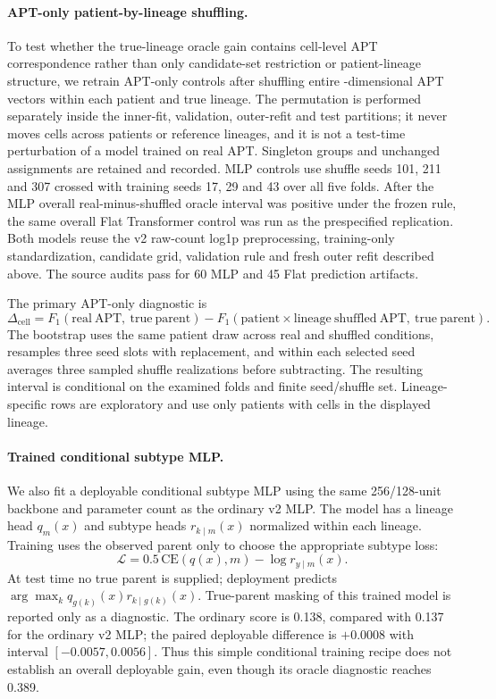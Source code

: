 \paragraph{APT-only patient-by-lineage shuffling.}
To test whether the true-lineage oracle gain contains cell-level APT
correspondence rather than only candidate-set restriction or patient-lineage
structure, we retrain APT-only controls after shuffling entire
\numaptfeatures{}-dimensional APT vectors within each patient and true
lineage. The permutation is performed separately inside the inner-fit,
validation, outer-refit and test partitions; it never moves cells across
patients or reference lineages, and it is not a test-time perturbation of a
model trained on real APT. Singleton groups and unchanged assignments are
retained and recorded. MLP controls use shuffle seeds 101, 211 and 307 crossed
with training seeds 17, 29 and 43 over all five folds. After the MLP overall
real-minus-shuffled oracle interval was positive under the frozen rule, the
same overall Flat Transformer control was run as the prespecified replication.
Both models reuse the v2 raw-count log1p preprocessing, training-only
standardization, candidate grid, validation rule and fresh outer refit
described above. The source audits pass for 60 MLP and 45 Flat prediction
artifacts.

The primary APT-only diagnostic is
\[
\Delta_{\mathrm{cell}} =
F_1(\mathrm{real\ APT,\ true\ parent})
-F_1(\mathrm{patient}\times\mathrm{lineage\ shuffled\ APT,\ true\ parent}).
\]
The bootstrap uses the same patient draw across real and shuffled conditions,
resamples three seed slots with replacement, and within each selected seed
averages three sampled shuffle realizations before subtracting. The resulting
interval is conditional on the examined folds and finite seed/shuffle set.
Lineage-specific rows are exploratory and use only patients with cells in the
displayed lineage.

\paragraph{Trained conditional subtype MLP.}
We also fit a deployable conditional subtype MLP using the same 256/128-unit
backbone and parameter count as the ordinary v2 MLP. The model has a lineage
head $q_m(x)$ and subtype heads $r_{k\mid m}(x)$ normalized within each
lineage. Training uses the observed parent only to choose the appropriate
subtype loss:
\[
\mathcal L = 0.5\,\mathrm{CE}(q(x),m)
             - \log r_{y\mid m}(x).
\]
At test time no true parent is supplied; deployment predicts
$\arg\max_k q_{g(k)}(x) r_{k\mid g(k)}(x)$. True-parent masking of this trained
model is reported only as a diagnostic. The ordinary score is 0.138, compared
with 0.137 for the ordinary v2 MLP; the paired deployable difference is
$+0.0008$ with interval $[-0.0057,0.0056]$. Thus this simple conditional
training recipe does not establish an overall deployable gain, even though its
oracle diagnostic reaches 0.389.

